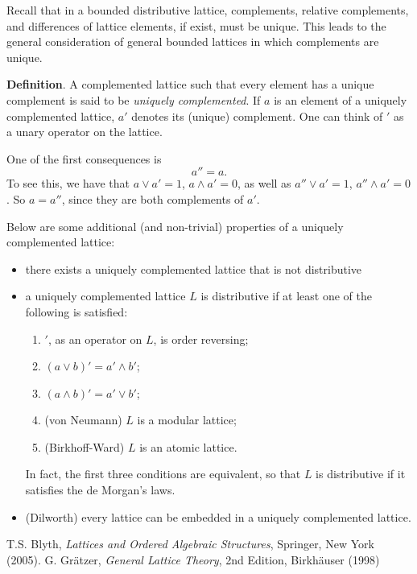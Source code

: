 \documentclass[12pt]{article}
\begin{document}
Recall that in a bounded distributive lattice, complements, relative complements, and differences of lattice elements, if exist, must be unique.  This leads to the general consideration of general bounded lattices in which complements are unique.

\textbf{Definition}.  A complemented lattice such that every element has a unique complement is said to be \emph{uniquely complemented}.  If $a$ is an element of a uniquely complemented lattice, $a'$ denotes its (unique) complement.  One can think of $'$ as a unary operator on the lattice.

One of the first consequences is $$a''=a.$$  To see this, we have that $a\vee a'=1$, $a\wedge a'=0$, as well as $a''\vee a'=1$, $a''\wedge a'=0$.  So $a=a''$, since they are both complements of $a'$.

Below are some additional (and non-trivial) properties of a uniquely complemented lattice:
\begin{itemize}
\item there exists a uniquely complemented lattice that is not distributive
\item a uniquely complemented lattice $L$ is distributive if at least one of the following is satisfied:
\begin{enumerate}
\item $'$, as an operator on $L$, is order reversing;
\item $(a\vee b)'=a'\wedge b'$;
\item $(a\wedge b)'=a'\vee b'$;
\item (von Neumann) $L$ is a modular lattice;
\item (Birkhoff-Ward) $L$ is an atomic lattice.
\end{enumerate}
In fact, the first three conditions are equivalent, so that $L$ is distributive if it satisfies the de Morgan's laws.
\item (Dilworth) every lattice can be embedded in a uniquely complemented lattice.
\end{itemize}

\begin{thebibliography}{6}
 T.S. Blyth, {\em Lattices and Ordered Algebraic Structures}, Springer, New York (2005).
 G. Gr\"atzer, {\it General Lattice Theory}, 2nd Edition, Birkh\"auser (1998)
\end{thebibliography}
\end{document}
